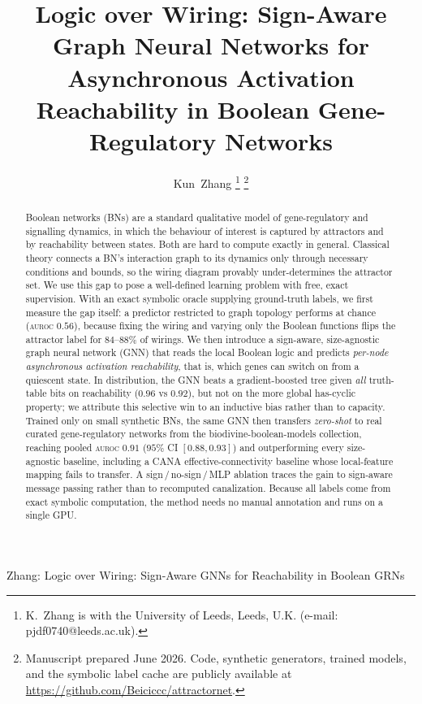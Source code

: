 \documentclass[journal]{IEEEtran}
\newcommand{\auroc}{\textsc{auroc}}
\begin{document}
\title{Logic over Wiring: Sign-Aware Graph Neural Networks
for Asynchronous Activation Reachability in Boolean
Gene-Regulatory Networks}

\author{Kun~Zhang%
\thanks{K.~Zhang is with the University of Leeds, Leeds, U.K.
(e-mail: pjdf0740@leeds.ac.uk).}%
\thanks{Manuscript prepared June 2026. Code, synthetic generators, trained models, and
the symbolic label cache are publicly available at
\url{https://github.com/Beiciccc/attractornet}.}}

%
{Zhang: Logic over Wiring: Sign-Aware GNNs for Reachability in Boolean GRNs}

\maketitle

\begin{abstract}
Boolean networks (BNs) are a standard qualitative model of gene-regulatory and
signalling dynamics, in which the behaviour of interest is captured by attractors and
by reachability between states. Both are hard to compute exactly in general. Classical
theory connects a BN's interaction graph to its dynamics only through necessary
conditions and bounds, so the wiring diagram provably under-determines the attractor
set. We use this gap to pose a well-defined learning problem with free, exact
supervision. With an exact symbolic oracle supplying ground-truth labels, we first
measure the gap itself: a predictor restricted to graph topology performs at chance
(\auroc{} $0.56$), because fixing the wiring and varying only the Boolean functions
flips the attractor label for $84$--$88\%$ of wirings. We then introduce a sign-aware,
size-agnostic graph neural network (GNN) that reads the local Boolean logic and
predicts \emph{per-node asynchronous activation reachability}, that is, which genes can
switch on from a quiescent state. In distribution, the GNN beats a gradient-boosted
tree given \emph{all} truth-table bits on reachability ($0.96$ vs $0.92$), but not on
the more global has-cyclic property; we attribute this selective win to an inductive
bias rather than to capacity. Trained only on small synthetic BNs, the same GNN then
transfers \emph{zero-shot} to real curated gene-regulatory networks from the
biodivine-boolean-models collection, reaching pooled \auroc{} $0.91$ ($95\%$ CI
$[0.88,0.93]$) and outperforming every size-agnostic baseline, including a CANA
effective-connectivity baseline whose local-feature mapping fails to transfer. A
sign\,/\,no-sign\,/\,MLP ablation traces the gain to sign-aware message passing rather
than to recomputed canalization. Because all labels come from exact symbolic
computation, the method needs no manual annotation and runs on a single GPU.
\end{abstract}
\end{document}
